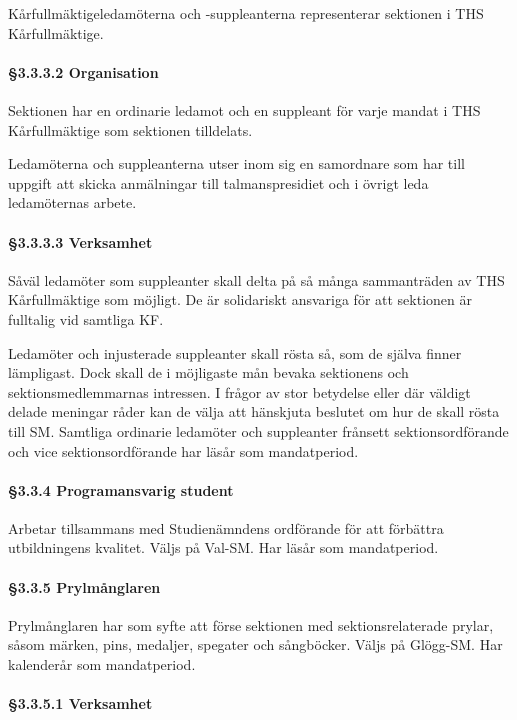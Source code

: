Kårfullmäktigeledamöterna och -suppleanterna representerar sektionen i THS Kårfullmäktige.

\paragraph{§3.3.3.2 Organisation}

Sektionen har en ordinarie ledamot och en suppleant för varje mandat i THS Kårfullmäktige som sektionen tilldelats.

Ledamöterna och suppleanterna utser inom sig en samordnare som har till uppgift att skicka anmälningar till talmanspresidiet och i övrigt leda ledamöternas arbete.

\paragraph{§3.3.3.3 Verksamhet}

Såväl ledamöter som suppleanter skall delta på så många sammanträden av THS Kårfullmäktige som möjligt. De är solidariskt ansvariga för att sektionen är fulltalig vid samtliga KF.

Ledamöter och injusterade suppleanter skall rösta så, som de själva finner lämpligast. Dock skall de i möjligaste mån bevaka sektionens och sektionsmedlemmarnas intressen. I frågor av stor betydelse eller där väldigt delade meningar råder kan de välja att hänskjuta beslutet om hur de skall rösta till SM. Samtliga ordinarie ledamöter och suppleanter frånsett sektionsordförande och vice sektionsordförande har läsår som mandatperiod.

\paragraph{§3.3.4 Programansvarig student}

Arbetar tillsammans med Studienämndens ordförande för att förbättra utbildningens kvalitet. Väljs på Val-SM. Har läsår som mandatperiod.

\paragraph{§3.3.5 Prylmånglaren}

Prylmånglaren har som syfte att förse sektionen med sektionsrelaterade prylar, såsom märken, pins, medaljer, spegater och sångböcker. Väljs på Glögg-SM. Har kalenderår som mandatperiod.

\paragraph{§3.3.5.1 Verksamhet}

